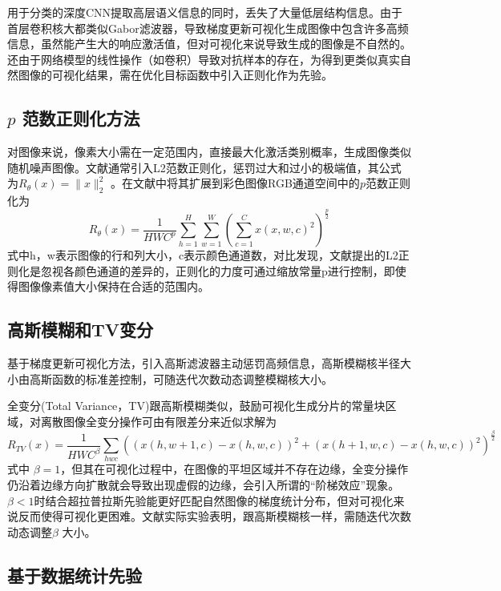    用于分类的深度CNN提取高层语义信息的同时，丢失了大量低层结构信息。由于首层卷积核大都类似Gabor滤波器，导致梯度更新可视化生成图像中包含许多高频信息，虽然能产生大的响应激活值，但对可视化来说导致生成的图像是不自然的。还由于网络模型的线性操作（如卷积）导致对抗样本\citep{Goodfellow2014}的存在，为得到更类似真实自然图像的可视化结果，需在优化目标函数中引入正则化作为先验。
\subsection{$p$ 范数正则化方法} 

   对图像来说，像素大小需在一定范围内，直接最大化激活类别概率，生成图像类似随机噪声图像。文献通常引入L2范数正则化，惩罚过大和过小的极端值，其公式为$R_{\theta}(x)=\parallel x \parallel _{2}^{2}$ 。在文献\citep{Mahendran2015}中将其扩展到彩色图像RGB通道空间中的$p$范数正则化为
\begin{equation} \label{eq:ch04_05}
       R_{\theta}(x)= \frac{1}{HWC^p}\sum_{h=1}^{H}\sum_{w=1}^{W}(\sum_{c=1}^{C}x(x,w,c)^2)^{\frac{p}{2}}
\end{equation}
式中h，w表示图像的行和列大小，c表示颜色通道数，对比发现，文献提出的L2正则化是忽视各颜色通道的差异的，正则化的力度可通过缩放常量p进行控制，即使得图像像素值大小保持在合适的范围内。
\subsection{高斯模糊和TV变分}

基于梯度更新可视化方法，引入高斯滤波器主动惩罚高频信息\citep{JasonYosinski2015}，高斯模糊核半径大小由高斯函数的标准差控制，可随迭代次数动态调整模糊核大小。


全变分\citep{Mahendran2015}(Total Variance，TV)跟高斯模糊类似，鼓励可视化生成分片的常量块区域，对离散图像全变分操作可由有限差分来近似求解为    \begin{equation} \label{eq:ch04_06}
       R_{TV}(x)= \frac{1}{HWC^\beta}\sum _{hwc}((x(h,w+1,c)-x(h,w,c))^2+(x(h+1,w,c)-x(h,w,c))^2)^{\frac{\beta}{2}}
\end{equation}
式中 $\beta =1$，但其在可视化过程中，在图像的平坦区域并不存在边缘，全变分操作仍沿着边缘方向扩散就会导致出现虚假的边缘，会引入所谓的“阶梯效应”现象。 $\beta<1$时结合超拉普拉斯先验\citep{Krishnan2009}能更好匹配自然图像的梯度统计分布，但对可视化来说反而使得可视化更困难。文献实际实验表明，跟高斯模糊核一样，需随迭代次数动态调整$\beta$ 大小。
\subsection{基于数据统计先验}

